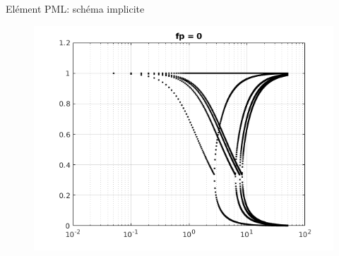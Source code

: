 \begin{frame}{Elément PML: schéma implicite}
\begin{figure}[ht] 
  \label{ fig7} 
  \begin{minipage}[b]{0.5\linewidth}
    \centering
    \includegraphics[scale=.34]{images/sr_imp_pml0.png} \\


\end{minipage}
\end{figure}
\end{frame}
